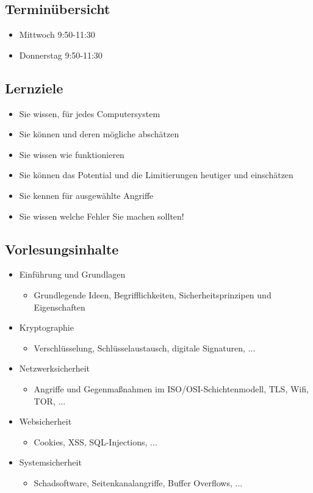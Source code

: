 \subsection{Terminübersicht}
\begin{itemize}
    \item Mittwoch 9:50-11:30
    \item Donnerstag 9:50-11:30
\end{itemize}
\subsection{Lernziele}
\begin{itemize}
    \item Sie wissen,  für jedes Computersystem
    \item Sie können  und deren mögliche  abschätzen
    \item Sie wissen wie  funktionieren
    \item Sie können das Potential und die Limitierungen heutiger  und  einschätzen
    \item Sie kennen  für ausgewählte Angriffe
    \item Sie wissen welche Fehler Sie  machen sollten!
\end{itemize}
\subsection{Vorlesungsinhalte}
\begin{itemize}
    \item Einführung und Grundlagen
    \begin{itemize}
        \item Grundlegende Ideen, Begrifflichkeiten, Sicherheitsprinzipen und Eigenschaften
    \end{itemize}
    \item Kryptographie
    \begin{itemize}
        \item Verschlüsselung, Schlüsselaustausch, digitale Signaturen, ...
    \end{itemize}
    \item Netzwerksicherheit
    \begin{itemize}
        \item Angriffe und Gegenmaßnahmen im ISO/OSI-Schichtenmodell, TLS, Wifi, TOR, ...
    \end{itemize}
    \item Websicherheit
    \begin{itemize}
        \item Cookies, XSS, SQL-Injections, ...
    \end{itemize}
    \item Systemsicherheit
    \begin{itemize}
        \item Schadsoftware, Seitenkanalangriffe, Buffer Overflows, ...
    \end{itemize}
\end{itemize}